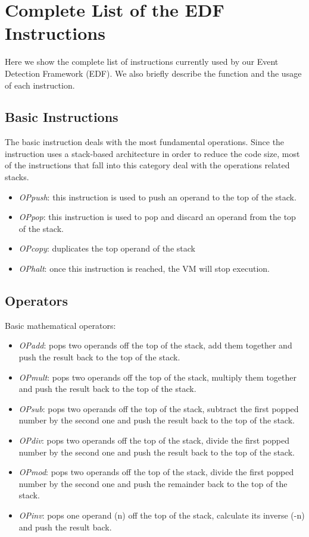\chapter{Complete List of the EDF Instructions}
\label{appendix:isa}
Here we show the complete list of instructions currently used by our Event Detection Framework (EDF). We also briefly describe the function and the usage of each instruction.

\section{Basic Instructions}
The basic instruction deals with the most fundamental operations. Since the instruction uses a stack-based architecture in order to reduce the code size, most of the instructions that fall into this category deal with the operations related stacks.
\begin{itemize}
\item \emph{OPpush}: this instruction is used to push an operand to the top of the stack.
\item \emph{OPpop}: this instruction is used to pop and discard an operand from the top of the stack.
\item \emph{OPcopy}: duplicates the top operand of the stack
\item \emph{OPhalt}: once this instruction is reached, the VM will stop execution.
\end{itemize}

\section{Operators}
Basic mathematical operators:
\begin{itemize}
\item \emph{OPadd}: pops two operands off the top of the stack, add them together and push the result back to the top of the stack.
\item \emph{OPmult}: pops two operands off the top of the stack, multiply them together and push the result back to the top of the stack.
\item \emph{OPsub}: pops two operands off the top of the stack, subtract the first popped number by the second one and push the result back to the top of the stack.
\item \emph{OPdiv}: pops two operands off the top of the stack, divide the first popped number by the second one and push the result back to the top of the stack.
\item \emph{OPmod}: pops two operands off the top of the stack, divide the first popped number by the second one and push the remainder back to the top of the stack.
\item \emph{OPinv}: pops one operand (n) off the top of the stack, calculate its inverse (-n) and push the result back.
\end{itemize}

